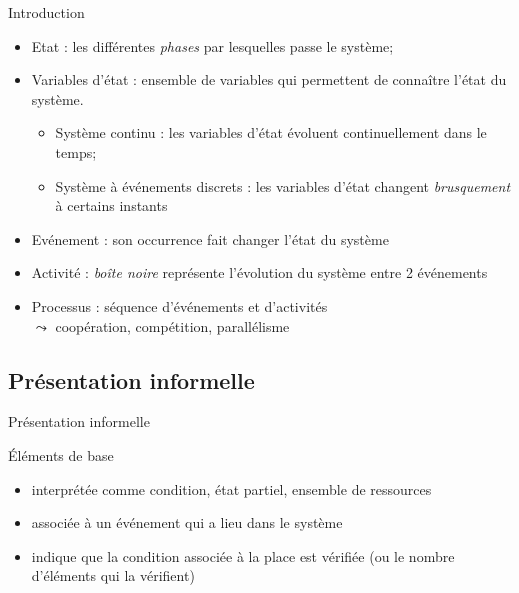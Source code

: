 \documentclass[compress]{beamer}
\begin{document}
\begin{frame}{Introduction}
\begin{itemize}
\item Etat : les différentes {\it phases} par lesquelles passe le système;
\item Variables d'état : ensemble de variables qui permettent de connaître l'état du système.
	\begin{itemize}
	\item Système continu : les variables d'état évoluent continuellement dans le temps;
	\item Système à événements discrets : les variables d'état changent {\it brusquement} à certains instants
	\end{itemize}
\item Evénement : son occurrence fait changer l'état du système
\item Activité : {\it boîte noire} représente l'évolution du système entre 2 événements
\item Processus : séquence d'événements et d'activités \\
	$\leadsto$  coopération, compétition, parallélisme
\end{itemize}
\end{frame}

\subsection{Présentation informelle}     
\begin{frame}{Présentation informelle}
\begin{block}{Éléments de base}
\begin{itemize}
\item {} interprétée comme condition, état partiel, ensemble de ressources
\item {} associée à un événement qui a lieu dans le système
\item {} indique que la condition associée à la place est vérifiée (ou le nombre d'éléments qui la vérifient)
\end{itemize}
\end{block}
\end{frame}
\end{document}
